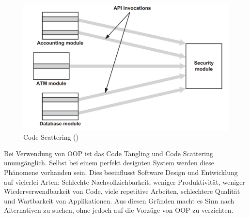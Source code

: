 \begin{figure}[H]
	\centering
		\includegraphics[scale=0.5]{bilder/motivationsCodeScattering.png}
	\caption{Code Scattering (\cite[p~54]{laddad:aspectj})}
	\label{fig:motivationcs}
\end{figure}

Bei Verwendung von OOP ist das Code Tangling und Code Scattering unumgänglich. Selbst bei einem perfekt designten System werden diese Phänomene vorhanden sein. Dies beeinflusst Software Design und Entwicklung auf vielerlei Arten: Schlechte Nachvollziehbarkeit, weniger Produktivität, weniger Wiederverwendbarkeit von Code, viele repetitive Arbeiten, schlechtere Qualität und Wartbarkeit von Applikationen. Aus diesen Gründen macht es Sinn nach Alternativen zu suchen, ohne jedoch auf die Vorzüge von OOP zu verzichten.

